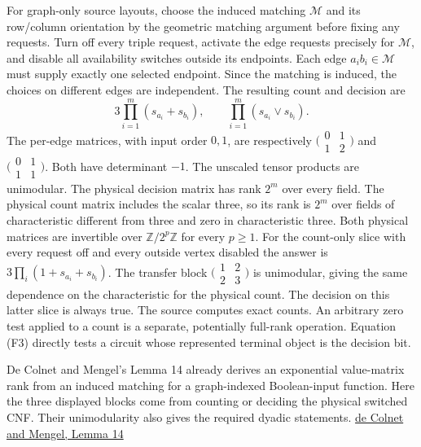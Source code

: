 \documentclass[11pt,a4paper]{article}
\begin{document}
For graph-only source layouts, choose the induced matching
\(\mathcal M\) and its row/column orientation by the geometric matching
argument before fixing any requests. Turn off every triple request,
activate the edge requests precisely for \(\mathcal M\), and disable all
availability switches outside its endpoints. Each edge
\(a_ib_i\in\mathcal M\) must supply exactly one selected endpoint. Since
the matching is induced, the choices on different edges are independent.
The resulting count and decision are \[
 3\prod_{i=1}^{m}(s_{a_i}+s_{b_i}),\qquad
 \prod_{i=1}^{m}(s_{a_i}\lor s_{b_i}).
 \tag{F3}
\] The per-edge matrices, with input order \(0,1\), are respectively
\(\bigl(\begin{smallmatrix}0&1\\1&2\end{smallmatrix}\bigr)\) and
\(\bigl(\begin{smallmatrix}0&1\\1&1\end{smallmatrix}\bigr)\). Both have
determinant \(-1\). The unscaled tensor products are unimodular. The
physical decision matrix has rank \(2^m\) over every field. The physical
count matrix includes the scalar three, so its rank is \(2^m\) over
fields of characteristic different from three and zero in characteristic
three. Both physical matrices are invertible over
\(\mathbb Z/2^p\mathbb Z\) for every \(p\ge1\). For the count-only slice
with every request off and every outside vertex disabled the answer is
\(3\prod_i(1+s_{a_i}+s_{b_i})\). The transfer block
\(\bigl(\begin{smallmatrix}1&2\\2&3\end{smallmatrix}\bigr)\) is
unimodular, giving the same dependence on the characteristic for the
physical count. The decision on this latter slice is always true. The
source computes exact counts. An arbitrary zero test applied to a count
is a separate, potentially full-rank operation. Equation (F3) directly
tests a circuit whose represented terminal object is the decision bit.

De Colnet and Mengel's Lemma 14 already derives an exponential
value-matrix rank from an induced matching for a graph-indexed
Boolean-input function. Here the three displayed blocks come from
counting or deciding the physical switched CNF. Their unimodularity also
gives the required dyadic statements.
\href{https://proceedings.kr.org/2021/20/kr2021-0020-de-colnet-et-al.pdf}{de
Colnet and Mengel, Lemma 14}
\end{document}
